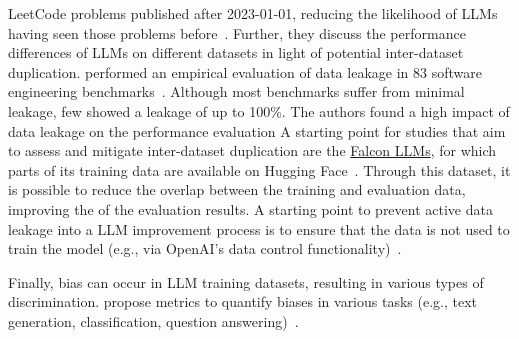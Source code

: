  LeetCode problems published after 2023-01-01, reducing the likelihood of LLMs having seen those problems before~\cite{DBLP:conf/ease/CoignionQR24}.
Further, they discuss the performance differences of LLMs on different datasets in light of potential inter-dataset duplication.
\citeauthor{zhou2025lessleakbenchinvestigationdataleakage} performed an empirical evaluation of data leakage in 83 software engineering benchmarks~\cite{zhou2025lessleakbenchinvestigationdataleakage}.
Although most benchmarks suffer from minimal leakage,   few showed a leakage of up to 100\%.
The authors found a high impact of data leakage on the performance evaluation
A starting point for studies that aim to assess and mitigate inter-dataset duplication are the \href{https://huggingface.co/datasets/tiiuae/falcon-refinedweb}{Falcon LLMs}, for which parts of its training data are available on Hugging Face~\cite{technology_innovation_institute_2023}.
Through this dataset, it is possible to reduce the overlap between the training and evaluation data, improving the  of the evaluation results.
A starting point to prevent active data leakage into a LLM improvement process is to ensure that the data is not used to train the model (e.g., via OpenAI's data control functionality)~\cite{DBLP:conf/eacl/BalloccuSLD24}.

Finally, bias can occur in LLM training datasets, resulting in various types of discrimination.
\citeauthor{DBLP:journals/corr/abs-2309-00770} propose metrics to quantify biases in various tasks (e.g., text generation, classification, question answering)~\cite{DBLP:journals/corr/abs-2309-00770}.


